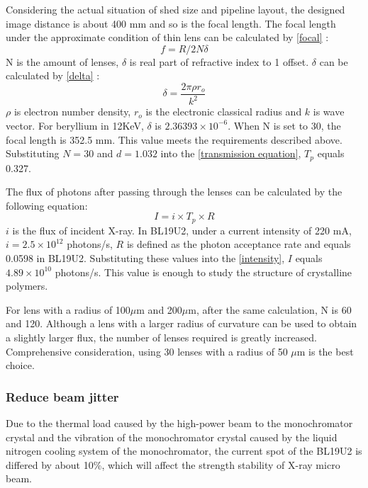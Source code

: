 \documentclass{Head}
\begin{document}
Considering the actual situation of shed size and pipeline layout, the designed image distance is about 400 mm and so is the focal length.
The focal length under the approximate condition of thin lens can be calculated by \autoref{focal} :
\begin{equation}
    f=R/2N\delta
    \label{focal}
\end{equation}
N is the amount of lenses, $\delta$ is real part of refractive index to 1 offset.
$\delta$ can be calculated by \autoref{delta} \cite{als2011elements}:
\begin{equation}
    \delta=\frac{2\pi\rho r_o}{k^2}
    \label{delta}
\end{equation}
$\rho$ is electron number density, $r_o$ is the electronic classical radius and $k$ is wave vector.
For beryllium in 12KeV, $\delta$ is $2.36393\times 10^{-6}$.
When N is set to 30, the focal length is 352.5 mm.
This value meets the requirements described above.
Substituting $N=30$ and $d=1.032$ into the \autoref{transmission equation}, $T_p$ equals 0.327.


The flux of photons after passing through the lenses can be calculated by the following equation:
\begin{equation}
    I=i\times T_p \times R
    \label{intensity}
\end{equation}
$i$ is the flux of incident X-ray.
In BL19U2, under a current intensity of 220 mA, $i=2.5\times 10^{12}$ photons/s, $R$ is defined as the photon acceptance rate and equals 0.0598 in BL19U2.
Substituting these values into the \autoref{intensity}, $I$ equals $4.89\times 10^{10}$ photons/s. This value is enough to study the structure of crystalline polymers.


For lens with a radius of 100$\mu$m and 200$\mu$m, after the same calculation, N is 60 and 120.
Although a lens with a larger radius of curvature can be used to obtain a slightly larger flux, the number of lenses required is greatly increased.
Comprehensive consideration, using 30 lenses with a radius of 50 $\mu$m is the best choice.
\subsubsection{Reduce beam jitter}
Due to the thermal load caused by the high-power beam to the monochromator crystal and the vibration of the monochromator crystal caused by the liquid nitrogen cooling system of the monochromator, the current spot of the BL19U2 is differed by about 10\%, which will affect the strength stability of X-ray micro beam.
\end{document}
